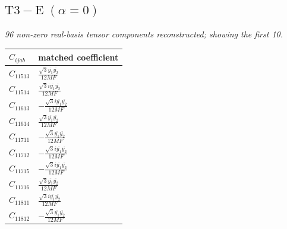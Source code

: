 \documentclass[9pt]{article}
\begin{document}
\subsection*{$ \mathrm{T3-E}\;(\alpha=0) $}
\textit{96 non-zero real-basis tensor components reconstructed; showing the first 10.}
\begin{longtable}{@{}ll@{}}
\toprule
$C_{ijab}$ & matched coefficient \\
\midrule
$C_{11513}$ & $ \frac{\sqrt{3} \overline{y_{1}} \overline{y_{2}}}{12 MF} $ \\
$C_{11514}$ & $ \frac{\sqrt{3} i \overline{y_{1}} \overline{y_{2}}}{12 MF} $ \\
$C_{11613}$ & $ - \frac{\sqrt{3} i \overline{y_{1}} \overline{y_{2}}}{12 MF} $ \\
$C_{11614}$ & $ \frac{\sqrt{3} \overline{y_{1}} \overline{y_{2}}}{12 MF} $ \\
$C_{11711}$ & $ - \frac{\sqrt{3} \overline{y_{1}} \overline{y_{2}}}{12 MF} $ \\
$C_{11712}$ & $ - \frac{\sqrt{3} i \overline{y_{1}} \overline{y_{2}}}{12 MF} $ \\
$C_{11715}$ & $ - \frac{\sqrt{3} i \overline{y_{1}} \overline{y_{2}}}{12 MF} $ \\
$C_{11716}$ & $ \frac{\sqrt{3} \overline{y_{1}} \overline{y_{2}}}{12 MF} $ \\
$C_{11811}$ & $ \frac{\sqrt{3} i \overline{y_{1}} \overline{y_{2}}}{12 MF} $ \\
$C_{11812}$ & $ - \frac{\sqrt{3} \overline{y_{1}} \overline{y_{2}}}{12 MF} $ \\
\bottomrule
\end{longtable}
\end{document}
